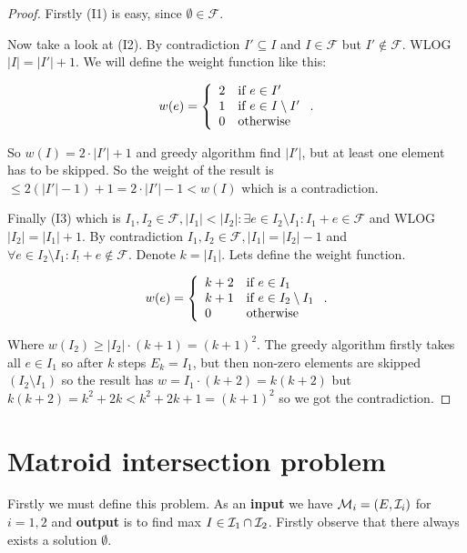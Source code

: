 \begin{proof}
	Firstly (I1) is easy, since $\emptyset \in \mathcal{F}$.
	
	Now take a look at (I2). By contradiction $I' \subseteq I$ and $I \in \mathcal{F}$ but $I' \notin \mathcal{F}$. WLOG $|I| = |I'| + 1$. We will define the weight function like this:
	
	$$
	w(e) = \left\{
	\begin{array}{l l}
		2 & \text{if } e \in I' \\
		1 & \text{if } e \in I \setminus I' \\
		0 & \text{otherwise}
	\end{array}
	\right..
	$$
	
	\noindent So $w(I) = 2 \cdot |I'| + 1$ and greedy algorithm find $|I'|$, but at least one element has to be skipped. So the weight of the result is $\leq 2(|I'| - 1) + 1 = 2 \cdot |I'| - 1 < w(I)$ which is a contradiction.
	
	Finally (I3) which is $I_1, I_2 \in \mathcal{F}, |I_1| < |I_2| : \exists e \in I_2 \setminus I_1 : I_1 + e \in \mathcal{F}$ and WLOG $|I_2| = |I_1| + 1$. By contradiction $I_1, I_2 \in \mathcal{F}, |I_1| = |I_2| - 1$ and $\forall e \in I_2 \setminus I_1 : I_! + e \notin \mathcal{F}$. Denote $k = |I_1|$. Lets define the weight function.
	
	$$
	w(e) = \left\{
	\begin{array}{l l}
		k+2 & \text{if } e \in I_1 \\
		k+1 & \text{if } e \in I_2 \setminus I_1 \\
		0 & \text{otherwise}
	\end{array}
	\right..
	$$
	
	\noindent Where $w(I_2) \geq |I_2| \cdot (k+1) = (k+1)^2$. The greedy algorithm firstly takes all $e \in I_1$ so after $k$ steps $E_k = I_1$, but then non-zero elements are skipped $(I_2 \setminus I_1)$ so the result has $w = I_1 \cdot (k+2) = k (k+2)$ but $k (k+2) = k^2 +2k < k^2 +2k + 1 = (k+1)^2$ so we got the contradiction.
\end{proof}

\section{Matroid intersection problem}

Firstly we must define this problem. As an \textbf{input} we have $\mathcal{M}_i = (E, \mathcal{I}_i)$ for $i = 1,2$ and \textbf{output} is to find max $I \in \mathcal{I}_1 \cap \mathcal{I}_2$. Firstly observe that there always exists a solution $\emptyset$.

